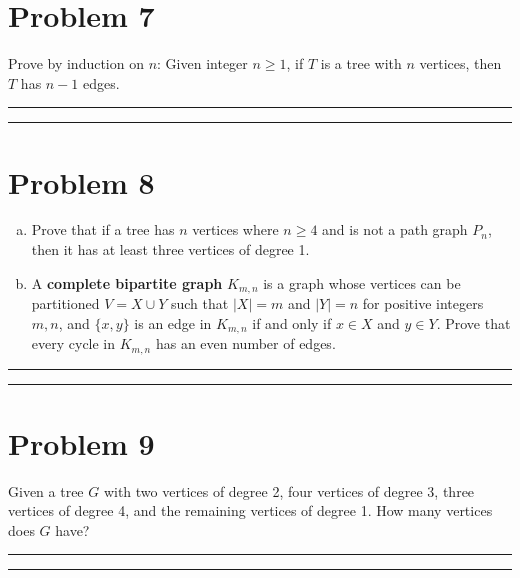\documentclass{article}
\theoremstyle{definition}
\newenvironment{solution}{\bigskip\hrule{\hfill}}{\bigskip\hrule{\hfill}} %
\begin{document}
\section*{Problem 7}
Prove by induction on $n$: Given integer $n\geq 1$, if  $T$ is a tree with $n$ vertices, then $T$ has $n-1$ edges. 
\begin{solution}


\end{solution}


\newpage


\section*{Problem 8}
\begin{enumerate}[a)] %
	\item Prove that if a tree has $n$ vertices where $n\geq 4$ and is not a path graph $P_n$, then it has at least three vertices of degree 1.
	\item A \textbf{complete bipartite graph} $K_{m,n}$ is a graph whose vertices can be partitioned $V=X\cup Y$ such that $|X|=m$ and  $|Y|=n$ for positive integers $m,n$, and $\{x, y\}$ is an edge in $K_{m,n}$ if and only if $x\in X$ and $y\in Y$. Prove that every cycle in $K_{m, n}$ has an even number of edges.
\end{enumerate}
\begin{solution}


\end{solution}


\newpage


\section*{Problem 9}
Given a tree $G$ with two vertices of degree 2, four vertices of degree 3, three vertices of degree 4, and the remaining vertices of degree 1. How many vertices does $G$ have?    
\begin{solution}


\end{solution}

\end{document}
